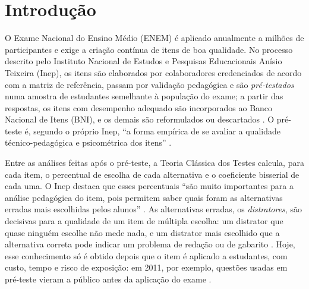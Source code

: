 
\section{Introdução}\label{sec:introducao}

O Exame Nacional do Ensino Médio (ENEM) é aplicado anualmente a milhões de participantes e exige a criação contínua de itens de boa qualidade. No processo descrito pelo Instituto Nacional de Estudos e Pesquisas Educacionais Anísio Teixeira (Inep), os itens são elaborados por colaboradores credenciados de acordo com a matriz de referência, passam por validação pedagógica e são \emph{pré-testados} numa amostra de estudantes semelhante à população do exame; a partir das respostas, os itens com desempenho adequado são incorporados ao Banco Nacional de Itens (BNI), e os demais são reformulados ou descartados \citep{inep2021guia}. O pré-teste é, segundo o próprio Inep, ``a forma empírica de se avaliar a qualidade técnico-pedagógica e psicométrica dos itens'' \citep[p.~9]{inep2021procedimentos}.

Entre as análises feitas após o pré-teste, a Teoria Clássica dos Testes calcula, para cada item, o percentual de escolha de cada alternativa e o coeficiente bisserial de cada uma. O Inep destaca que esses percentuais ``são muito importantes para a análise pedagógica do item, pois permitem saber quais foram as alternativas erradas mais escolhidas pelos alunos'' \citep[p.~11]{inep2021procedimentos}. As alternativas erradas, os \emph{distratores}, são decisivas para a qualidade de um item de múltipla escolha: um distrator que quase ninguém escolhe não mede nada, e um distrator mais escolhido que a alternativa correta pode indicar um problema de redação ou de gabarito \citep{haladyna1993,tarrant2009,benedetto2025}. Hoje, esse conhecimento só é obtido depois que o item é aplicado a estudantes, com custo, tempo e risco de exposição: em 2011, por exemplo, questões usadas em pré-teste vieram a público antes da aplicação do exame \citep{marinho2023}.


